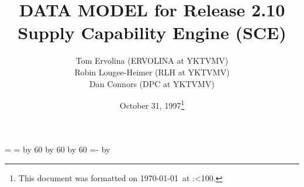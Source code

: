 \topmargin 0.0in
\headheight 0.0in
\headsep 0.0in
\textwidth 7.5in
\oddsidemargin -0.5in
\textheight 9in
\newcount\hh
\newcount\mm

\mm=\time
\hh=\time
\divide\hh by 60
\divide\mm by 60
\multiply\mm by 60
\mm=-\mm
\advance\mm by \time
\def\hhmm{\number\hh:\ifnum\mm<10{}0\fi\number\mm}


\title{\Large DATA MODEL for Release 2.10  Supply Capability Engine (SCE)}
\author{Tom Ervolina (ERVOLINA at YKTVMV)
\\Robin Lougee-Heimer (RLH at YKTVMV) \\ Dan Connors  (DPC at YKTVMV)}
\date{October 31, 1997\footnote{This document was 
formatted on \today\ at \hhmm.}}
\maketitle

